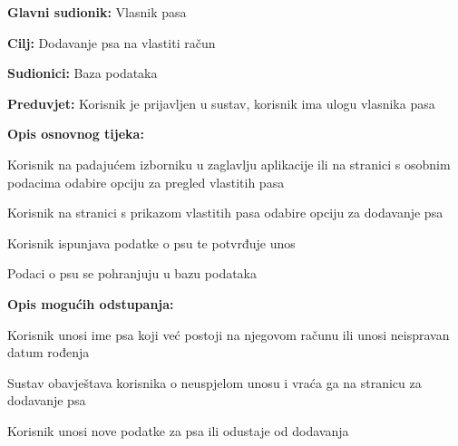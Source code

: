 					\noindent {}
					\begin{packed_item}
						
						\item \textbf{Glavni sudionik: } Vlasnik pasa
						\item  \textbf{Cilj:} Dodavanje psa na vlastiti račun
						\item  \textbf{Sudionici:} Baza podataka 
						\item  \textbf{Preduvjet:} Korisnik je prijavljen u sustav, korisnik ima ulogu vlasnika pasa
						\item  \textbf{Opis osnovnog tijeka:}
						
						\item[] \begin{packed_enum}
							
							\item Korisnik na padajućem izborniku u zaglavlju aplikacije ili na stranici s osobnim podacima odabire opciju za pregled vlastitih pasa 
							\item Korisnik na stranici s prikazom vlastitih pasa odabire opciju za dodavanje psa
							\item Korisnik ispunjava podatke o psu te potvrđuje unos
							\item Podaci o psu se pohranjuju u bazu podataka
							
						\end{packed_enum}
						
						
						\item  \textbf{Opis mogućih odstupanja:}
						
						\item[] \begin{packed_item}
							
							\item[3.a] Korisnik unosi ime psa koji već postoji na njegovom računu ili unosi neispravan datum rođenja
							\item[] \begin{packed_enum}
								\item Sustav obavještava korisnika o neuspjelom unosu i vraća ga na stranicu za dodavanje psa  
								\item Korisnik unosi nove podatke za psa ili odustaje od dodavanja
							\end{packed_enum}
						\end{packed_item}
					\end{packed_item}

